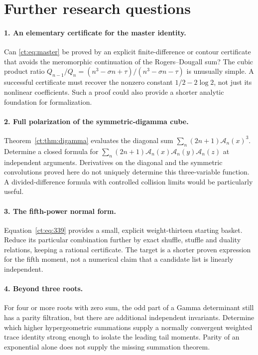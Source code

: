 \documentclass[11pt]{article}
\numberwithin{equation}{section}
\theoremstyle{definition}\newtheorem{definition}[theorem]{Definition}
\theoremstyle{remark}\newtheorem{remark}[theorem]{Remark}
\begin{document}
\section{Further research questions}
\label{ct:sec:future}
\paragraph{1. An elementary certificate for the master identity.}
Can \eqref{ct:eq:master} be proved by an explicit finite-difference or
contour certificate that avoids the meromorphic continuation of the
Rogers--Dougall sum? The cubic product ratio
$Q_{n-1}/Q_n=(n^3-\sigma n+\tau)/(n^3-\sigma n-\tau)$ is unusually simple.
A successful certificate must recover the nonzero constant
$1/2-2\log2$, not just its nonlinear coefficients. Such a proof could also
provide a shorter analytic foundation for formalization.

\paragraph{2. Full polarization of the symmetric-digamma cube.}
Theorem~\ref{ct:thm:digamma} evaluates the diagonal sum
$\sum_n(2n+1)\mathcal A_n(x)^3$. Determine a closed formula for
$\sum_n(2n+1)\mathcal A_n(x)\mathcal A_n(y)\mathcal A_n(z)$ at independent
arguments. Derivatives on the diagonal and the symmetric convolutions
proved here do not uniquely determine this three-variable function.
A divided-difference formula with controlled collision limits would be
particularly useful.

\paragraph{3. The fifth-power normal form.}
Equation~\eqref{ct:eq:339} provides a small, explicit weight-thirteen
starting basket. Reduce its particular combination further by exact
shuffle, stuffle and duality relations, keeping a rational certificate.
The target is a shorter proven expression for the fifth moment, not a
numerical claim that a candidate list is linearly independent.

\paragraph{4. Beyond three roots.}
For four or more roots with zero sum, the odd part of a Gamma determinant
still has a parity filtration, but there are additional independent
invariants. Determine which higher hypergeometric summations supply a
normally convergent weighted trace identity strong enough to isolate the
leading tail moments. Parity of an exponential alone does not supply the
missing summation theorem.
\end{document}
